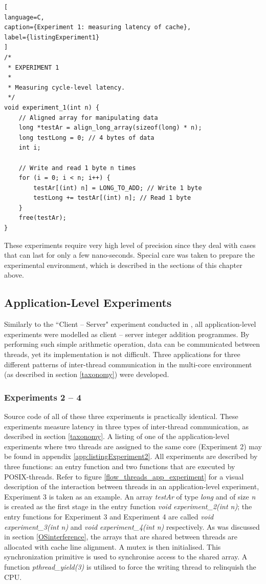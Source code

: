 \begin{lstlisting}[
language=C,
caption={Experiment 1: measuring latency of cache},
label={listingExperiment1}
]
/*
 * EXPERIMENT 1
 *
 * Measuring cycle-level latency.
 */
void experiment_1(int n) {
	// Aligned array for manipulating data
	long *testAr = align_long_array(sizeof(long) * n); 
	long testLong = 0; // 4 bytes of data
	int i;
	
	// Write and read 1 byte n times
	for (i = 0; i < n; i++) {
		testAr[(int) n] = LONG_TO_ADD; // Write 1 byte
		testLong += testAr[(int) n]; // Read 1 byte
	}
	free(testAr);
}
\end{lstlisting}

These experiments require very high level of precision since they deal with cases that can last for only a few nano-seconds. Special care was taken to prepare the experimental environment, which is described in the sections of this chapter above.

\subsection{Application-Level Experiments}
\label{app_design}

Similarly to the ``Client -- Server" experiment conducted in \cite[p.~63]{Bazilinskyy2013}, all application-level experiments were modelled as client -- server integer addition programmes. By performing such simple arithmetic operation, data can be communicated between threads, yet its implementation is not difficult. Three applications for three different patterns of inter-thread communication in the multi-core environment (as described in section \ref{taxonomy}) were developed.

\subsubsection{Experiments 2 -- 4}

Source code of all of these three experiments is practically identical. These experiments measure latency in three types of inter-thread communication, as described in section \ref{taxonomy}. A listing of one of the application-level experiments where two threads are assigned to the same core (Experiment 2) may be found in appendix \ref{app:listingExperiment2}. All experiments are described by three functions: an entry function and two functions that are executed by POSIX-threads. Refer to figure \ref{flow_threads_app_experiment} for a visual description of the interaction between threads in an application-level experiment, Experiment 3 is taken as an example. An array \textit{testAr} of type \textit{long} and of size \textit{n} is created as the first stage in the entry function \textit{void experiment\_2(int n)}; the entry functions for Experiment 3 and Experiment 4 are called \textit{void experiment\_3(int n)} and \textit{void experiment\_4(int n)} respectively. As was discussed in section \ref{OSinterference}, the arrays that are shared between threads are allocated with cache line alignment. A mutex is then initialised. This synchronization primitive is used to synchronise access to the shared array. A function \textit{pthread\_yield(3)} is utilised to force the writing thread to relinquish the CPU.

